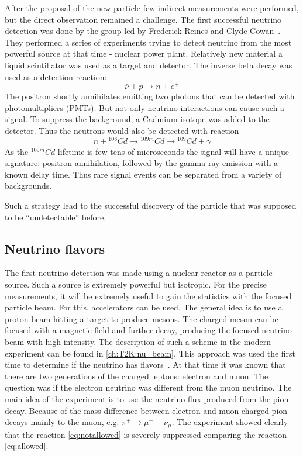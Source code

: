 \documentclass[../main.tex]{subfiles}
\begin{document}
After the proposal of the new particle few indirect measurements were performed, but the direct observation remained a challenge. The first successful neutrino detection was done by the group led by Frederick Reines and Clyde Cowan~\cite{Cowan1956}. They performed a series of experiments trying to detect neutrino from the most powerful source at that time - nuclear power plant. Relatively new material a liquid scintillator was used as a target and detector. The inverse beta decay was used as a detection reaction:
\begin{equation}
\bar{\nu}+p\to n+e^+
\end{equation}
The positron shortly annihilates emitting two photons that can be detected with photomultipliers (PMTs). But not only neutrino interactions can cause such a signal. To suppress the background, a Cadmium isotope was added to the detector. Thus the neutrons would also be detected with reaction
\begin{equation}
n+{}^{108}Cd\to{}^{109m}Cd\to{}^{109}Cd+\gamma
\end{equation}
As the ${}^{109m}Cd$ lifetime is few tens of microseconds the signal will have a unique signature: positron annihilation, followed by the gamma-ray emission with a known delay time. Thus rare signal events can be separated from a variety of backgrounds.

Such a strategy lead to the successful discovery of the particle that was supposed to be ``undetectable'' before.

\subsection{Neutrino flavors}
\label{sec:dublet}
The first neutrino detection was made using a nuclear reactor as a particle source. Such a source is extremely powerful but isotropic. For the precise measurements, it will be extremely useful to gain the statistics with the focused particle beam. For this, accelerators can be used. The general idea is to use a proton beam hitting a target to produce mesons. The charged meson can be focused with a magnetic field and further decay, producing the focused neutrino beam with high intensity. The description of such a scheme in the modern experiment can be found in \autoref{ch:T2K:nu_beam}. This approach was used the first time to determine if the neutrino has flavors~\cite{Danby1962}. At that time it was known that there are two generations of the charged leptons: electron and muon. The question was if the electron neutrino was different from the muon neutrino. The main idea of the experiment is to use the neutrino flux produced from the pion decay. Because of the mass difference between electron and muon charged pion decays mainly to the muon, e.g. $\pi^+\to\mu^++\nu_\mu$. The experiment showed clearly that the reaction \autoref{eq:notallowed} is severely suppressed comparing the reaction \autoref{eq:allowed}.
\end{document}
